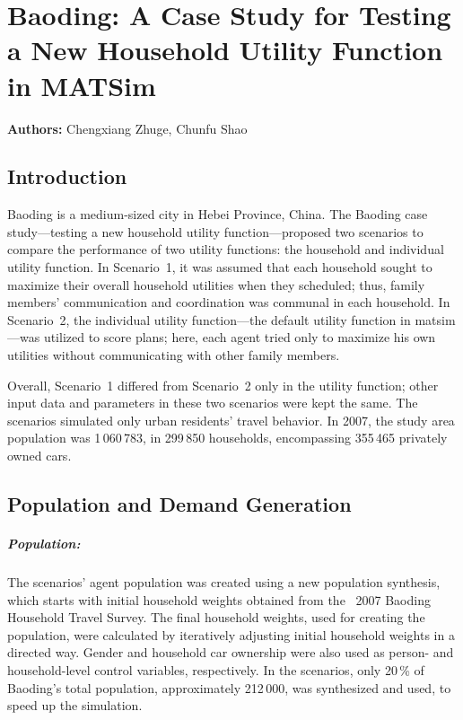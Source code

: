 \chapter{Baoding: A Case Study for Testing a New Household Utility Function in MATSim}
\label{ch:baoding}
\hfill \textbf{Authors:} Chengxiang Zhuge, Chunfu Shao



\section{Introduction}
Baoding is a medium-sized city in Hebei Province, China. 
The Baoding case study---testing a new household utility function---proposed two scenarios to compare the performance of two utility functions: the household and individual utility function. 
In Scenario~1, it was assumed that each household sought to maximize their overall household utilities when they scheduled; thus, family members' communication and coordination was communal in each household. In Scenario~2, the individual utility function---the default utility function in \gls{matsim}---was utilized to score plans; here, each agent tried only  to maximize his own utilities without communicating with other family members. 

Overall, Scenario~1 differed from Scenario~2 only in the utility function; other input data and parameters in these two scenarios were kept the same. 
The scenarios simulated only urban residents' travel behavior. 
In 2007, the study area population was 1\,060\,783, in 299\,850 households, encompassing 355\,465 privately owned cars.  

\section{Population and Demand Generation}
\paragraph{Population:} The scenarios' agent population was created using a new population synthesis, which  starts with initial household weights obtained from the ~2007 Baoding  Household Travel Survey. 
The final household weights, used for creating the population, were calculated by iteratively adjusting initial household weights in a directed way. 
Gender and household car ownership were also used as person- and household-level control variables, respectively. 
In the scenarios, only 20\,\% of Baoding's total population, approximately 212\,000, was synthesized and used, to speed up the simulation. 

